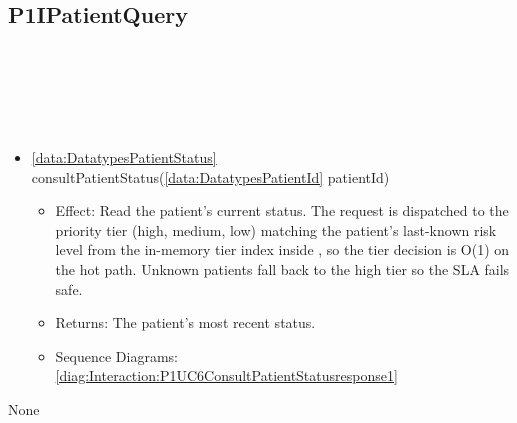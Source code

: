   \subsection{P1IPatientQuery}\label{int:InterfacesP1IPatientQuery}
    \begin{description}
      \item[Provided by:] \iconcomponent{}~
      \item[Required by:] \iconcomponent{}~ 
      \item[Operations:] ~
    \begin{itemize}[noitemsep,nolistsep,leftmargin=-.25cm]
      \item \textsf{\ref{data:DatatypesPatientStatus} consultPatientStatus(\ref{data:DatatypesPatientId} patientId)}
        \begin{itemize}[noitemsep,nolistsep]
           \item Effect: Read the patient's current status. The request is dispatched to the priority tier (high, medium, low) matching the patient's last-known risk level from the in-memory tier index inside , so the tier decision is O(1) on the hot path. Unknown patients fall back to the high tier so the SLA fails safe. 
           \item Returns: The patient's most recent status.
           \item Sequence Diagrams: \cref{diag:Interaction:P1UC6ConsultPatientStatusresponse1}
        \end{itemize}
    \end{itemize}
      \item[Diagrams:] None
    \end{description}

